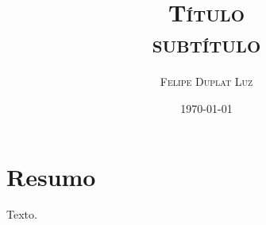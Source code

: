 \documentclass{article}
\title{\textbf{\textsc{Título}} \\ \Large \textsc{subtítulo}}
\author{\textsc{Felipe Duplat Luz}}
\date{\textsc{\today}}
\begin{document}
	\maketitle
	
\section*{Resumo}
\setlength\parskip{0.3cm}

Texto. \cite{jones71,samuelson71}



\pagebreak
\printbibliography[title={Referências:}]
\end{document}
